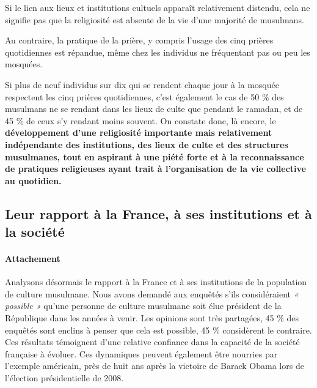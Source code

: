 Si le lien aux lieux et institutions cultuels apparaît relativement
distendu, cela ne signifie pas que la religiosité est absente de la vie
d'une majorité de musulmans.

Au contraire, la pratique de la prière, y compris l'usage des cinq
prières quotidiennes est répandue, même chez les individus ne
fréquentant pas ou peu les mosquées.

Si plus de neuf individus sur dix qui se rendent chaque jour à la
mosquée respectent les cinq prières quotidiennes, c'est également le cas
de 50 \% des musulmans ne se rendant dans les lieux de culte que pendant
le ramadan, et de 45 \% de ceux s'y rendant moins souvent. On constate
donc, là encore, le \textbf{développement d'une religiosité importante
mais relativement indépendante des institutions, des lieux de culte et
des structures musulmanes, tout en aspirant à une piété forte et à la
reconnaissance de pratiques religieuses ayant trait à l'organisation de
la vie collective au quotidien.}




  \subsection{Leur rapport à la France, à ses institutions et à la société}
  
  
    \paragraph{Attachement}



Analysons désormais le rapport à la France et à ses institutions de la
population de culture musulmane. Nous avons demandé aux enquêtés s'ils
considéraient \emph{« possible »} qu'une personne de culture musulmane soit élue
président de la République dans les années à venir. Les opinions sont
très partagées, 45 \% des enquêtés sont enclins à penser que cela est
possible, 45 \% considèrent le contraire. Ces résultats témoignent d'une
relative confiance dans la capacité de la société française à évoluer.
Ces dynamiques peuvent également être nourries par l'exemple américain,
près de huit ans après la victoire de Barack Obama lors de l'élection
présidentielle de 2008.

